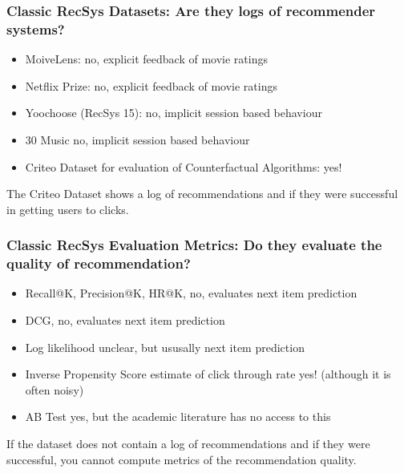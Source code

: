  \begin{frame}
  \frametitle{Classic RecSys Datasets: Are they logs of recommender systems?}

  \begin{itemize}
    \item MoiveLens: \pause no, explicit feedback of movie ratings \pause
    \item Netflix Prize: \pause no, explicit feedback of movie ratings \pause
    \item Yoochoose (RecSys 15): \pause no, implicit session based behaviour \pause
    \item 30 Music \pause no, implicit session based behaviour \pause
    \item Criteo Dataset for evaluation of Counterfactual Algorithms: \pause yes!
  \end{itemize}

  \pause
  The Criteo Dataset shows a log of recommendations and if they were successful in getting users to clicks.  
\end{frame}



\begin{frame}
  \frametitle{Classic RecSys Evaluation Metrics: Do they evaluate the quality of recommendation?}

  \begin{itemize}
    \item Recall@K, Precision@K, HR@K,  \pause no, evaluates next item prediction \pause
    \item DCG,   \pause no, evaluates next item prediction \pause
    \item Log likelihood \pause  unclear, but ususally next item prediction \pause
    \item Inverse Propensity Score estimate of click through rate \pause yes! (although it is often noisy) \pause
    \item AB Test \pause yes, but the academic literature has no access to this
  \end{itemize}

  \pause
If the dataset does not contain a log of recommendations and if they were successful, you cannot compute metrics of the recommendation quality.
\end{frame}


